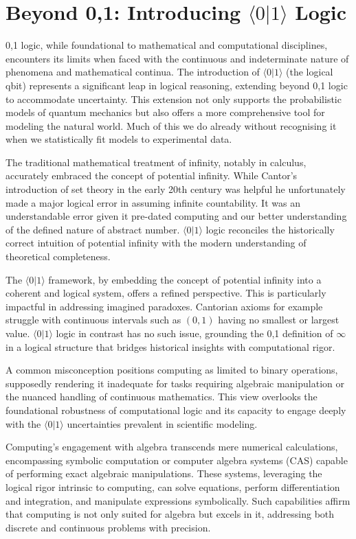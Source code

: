 \documentclass[12pt]{article}
\newcommand{\qbit}{\ensuremath{\langle 0 | 1 \rangle}}
\begin{document}
\section*{Beyond {0,1}: Introducing \(\qbit\) Logic}
 {0,1} logic, while foundational to mathematical and computational disciplines, encounters its limits when faced with the continuous and indeterminate nature of phenomena and mathematical continua. The introduction of \(\qbit\) (the logical qbit) represents a significant leap in logical reasoning, extending beyond {0,1} logic to accommodate uncertainty. This extension not only supports the probabilistic models of quantum mechanics but also offers a more comprehensive tool for modeling the natural world. Much of this we do already without recognising it when we statistically fit models to experimental data.

The traditional mathematical treatment of infinity, notably in calculus, accurately embraced the concept of potential infinity. While Cantor's introduction of set theory in the early 20th century was helpful he unfortunately made a major logical error in assuming infinite countability. It was an understandable error given it pre-dated computing and our better understanding of the defined nature of abstract number. \(\qbit\) logic reconciles the historically correct intuition of potential infinity with the modern understanding of theoretical completeness.

The \(\qbit\) framework, by embedding the concept of potential infinity into a coherent and logical system, offers a refined perspective. This is particularly impactful in addressing imagined paradoxes. Cantorian axioms for example struggle with continuous intervals such as \((0,1)\) having no smallest or largest value. \(\qbit\) logic in contrast has no such issue, grounding the {0,1} definition of \(\infty\) in a logical structure that bridges historical insights with computational rigor.

A common misconception positions computing as limited to binary operations, supposedly rendering it inadequate for tasks requiring algebraic manipulation or the nuanced handling of continuous mathematics. This view overlooks the foundational robustness of computational logic and its capacity to engage deeply with the \(\qbit\) uncertainties prevalent in scientific modeling.

Computing's engagement with algebra transcends mere numerical calculations, encompassing symbolic computation or computer algebra systems (CAS) capable of performing exact algebraic manipulations. These systems, leveraging the logical rigor intrinsic to computing, can solve equations, perform differentiation and integration, and manipulate expressions symbolically. Such capabilities affirm that computing is not only suited for algebra but excels in it, addressing both discrete and continuous problems with precision.
\end{document}
